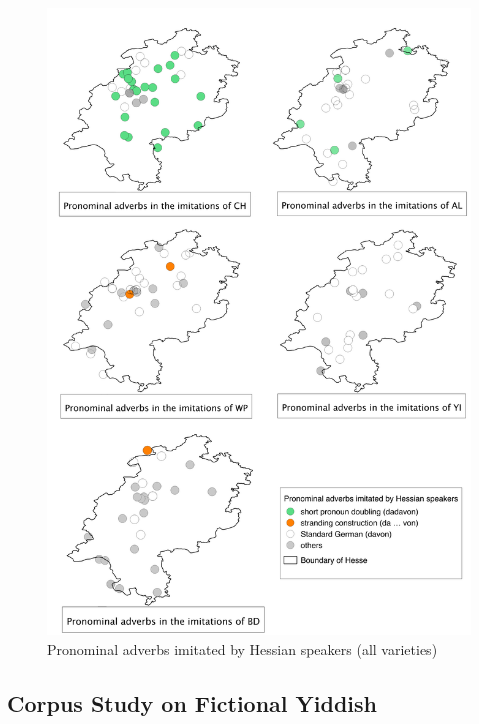 \documentclass[output=paper]{LSP/langsci}
\begin{document}
\begin{figure}[h!]
\centering
\includegraphics[scale=0.49]{illustrations/schaf_etal_fig4}
		\caption{\label{diagramdadavonhessen} Pronominal adverbs imitated by Hessian speakers (all varieties)}
	\end{figure}
\FloatBarrier
 
	
\subsection{Corpus Study on Fictional Yiddish}\label{fiyi}
 
\end{document}
